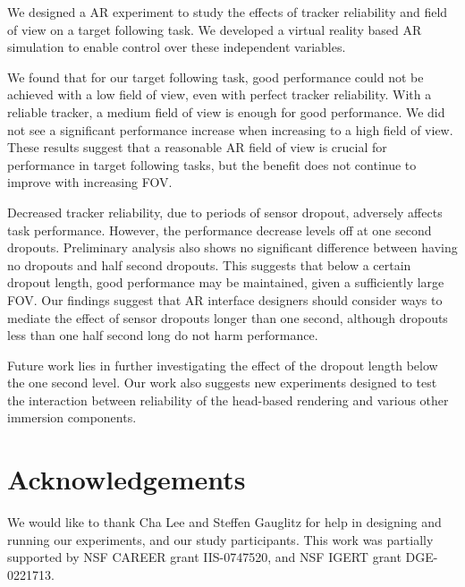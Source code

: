 \documentclass{acmsiggraph}                     %
\begin{document}
We designed a AR experiment to study the effects of tracker reliability and field of view on a target following task.  We developed a virtual reality based AR simulation to enable control over these independent variables.

We found that for our target following task, good performance could not be achieved with a low field of view, even with perfect tracker reliability.
With a reliable tracker, a medium field of view is enough for good performance.  We did not see a significant performance increase when increasing to a high field of view.  These results suggest that a reasonable AR field of view is crucial for performance in target following tasks, but the benefit does not continue to improve with increasing FOV.

Decreased tracker reliability, due to periods of sensor dropout, adversely affects task performance.  However, the performance decrease levels off at one second dropouts.  Preliminary analysis also shows no significant difference between having no dropouts and half second dropouts.
This suggests that below a certain dropout length, good performance may be maintained, given a sufficiently large FOV.
Our findings suggest that AR interface designers should consider ways to mediate the effect of sensor dropouts longer than one second, although dropouts less than one half second long do not harm performance.

Future work lies in further investigating the effect of the dropout length 
below the one second level.  Our work also suggests new experiments designed to test the interaction between reliability of the head-based rendering and various other immersion components.

\section*{Acknowledgements}
We would like to thank Cha Lee and Steffen Gauglitz for help in designing and running our experiments, and our study participants.  This work was partially supported by NSF CAREER grant IIS-0747520, and NSF IGERT grant DGE-0221713.



\end{document}
